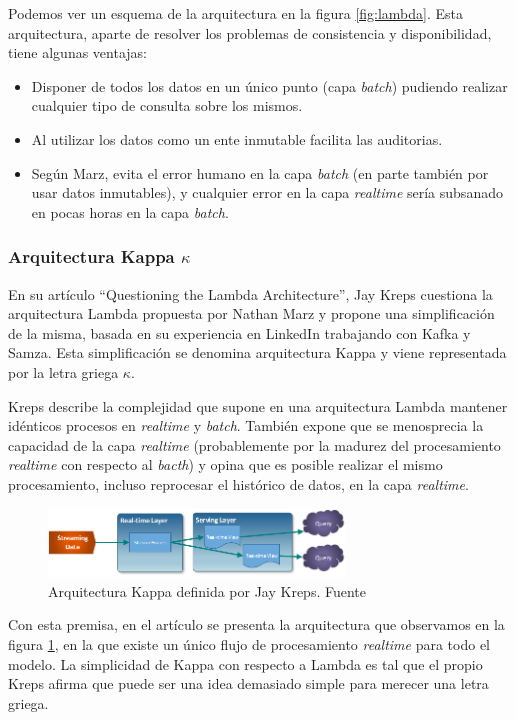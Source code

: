 Podemos ver un esquema de la arquitectura en la figura \ref{fig:lambda}. Esta arquitectura, aparte de resolver los problemas de consistencia y disponibilidad, tiene algunas ventajas:

\begin{itemize}
	
	\item Disponer de todos los datos en un único punto (capa \textit{batch}) pudiendo realizar cualquier tipo de consulta sobre los mismos. 
	\item Al utilizar los datos como un ente inmutable facilita las auditorias. 
	\item Según Marz, evita el error humano en la capa \textit{batch} (en parte también por usar datos inmutables), y cualquier error en la capa \textit{realtime} sería subsanado en pocas horas en la capa \textit{batch}.

\end{itemize}


\subsubsection{Arquitectura Kappa $\kappa$}  
En su artículo ``Questioning the Lambda Architecture''\cite{kappa}, Jay Kreps cuestiona la arquitectura Lambda propuesta por Nathan Marz y propone una simplificación de la misma, basada en su experiencia en LinkedIn trabajando con Kafka y Samza. Esta simplificación se denomina arquitectura Kappa y viene representada por la letra griega $\kappa$.


Kreps describe la complejidad que supone en una arquitectura Lambda mantener idénticos procesos en \textit{realtime} y \textit{batch}. También expone que se menosprecia la capacidad de la capa \textit{realtime} (probablemente por la madurez del procesamiento \textit{realtime} con respecto al \textit{bacth}) y opina que es posible realizar el mismo procesamiento, incluso reprocesar el histórico de datos, en la capa \textit{realtime}. 

\begin{figure}[!ht]
	\centering
	\includegraphics[width=0.70\textwidth]{images/arte/kappa}
	\caption{Arquitectura Kappa definida por Jay Kreps. Fuente \cite{lambdakappa}}
	\label{fig:kappa}
\end{figure}

Con esta premisa, en el artículo se presenta la arquitectura que observamos en la figura \ref{fig:kappa}, en la que existe un único flujo de procesamiento \textit{realtime} para todo el modelo. La simplicidad de Kappa con respecto a Lambda es tal que el propio Kreps afirma que puede ser una idea demasiado simple para merecer una letra griega.
